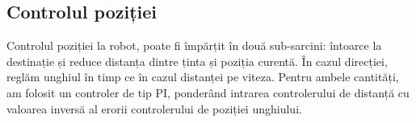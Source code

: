 \begin{titlepage}
\subsection*{Controlul poziției}

Controlul  poziției la robot, poate fi împărțit în două sub-sarcini: întoarce la destinație și reduce distanța dintre ținta și poziția curentă. În cazul direcției, reglăm unghiul în timp ce în cazul distanței pe viteza. Pentru ambele cantități, am folosit un controler de tip PI, ponderând intrarea controlerului de distanță cu valoarea inversă al erorii controlerului de poziției unghiului.
\end{titlepage}